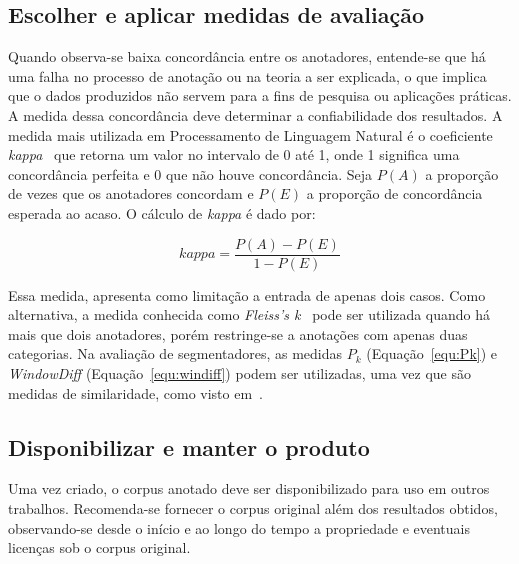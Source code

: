 \subsection*{Escolher e aplicar medidas de avaliação}

Quando observa-se baixa concordância entre os anotadores, entende-se que há uma falha no processo de anotação ou na teoria a ser explicada, o que implica que o dados produzidos não servem para a fins de pesquisa ou aplicações práticas. A medida dessa concordância deve determinar a confiabilidade dos resultados.
A medida mais utilizada em Processamento de Linguagem Natural é o coeficiente \textit{kappa}~\cite{Carletta1996} que retorna um valor no intervalo de 0 até 1, onde 1 significa uma concordância perfeita e 0 que não houve concordância. Seja $P(A)$ a proporção de vezes que os anotadores concordam e $P(E)$ a proporção de concordância esperada ao acaso. O cálculo de \textit{kappa} é dado por:

\begin{equation}
	kappa = \frac{P(A) - P(E)}{1 - P(E)}
\end{equation}

Essa medida, apresenta como limitação a entrada de apenas dois casos. Como alternativa, a medida conhecida como \textit{Fleiss's k}~\cite{Fleiss1979} pode ser utilizada quando há mais que dois anotadores, porém restringe-se a anotações com apenas duas categorias. 
Na avaliação de segmentadores, as medidas $P_k$ (Equação~\ref{equ:Pk}) e \textit{WindowDiff} (Equação~\ref{equ:windiff}) podem ser utilizadas, uma vez que são medidas de similaridade, como visto em~\cite{Kazantseva2012,Cardoso2017}.



\subsection*{Disponibilizar e manter o produto}

Uma vez criado, o corpus anotado deve ser disponibilizado para uso em outros trabalhos. 
Recomenda-se fornecer o corpus original além dos resultados obtidos, observando-se desde o início e ao longo do tempo a propriedade e eventuais licenças sob o corpus original.




